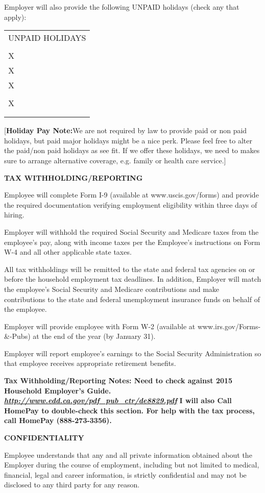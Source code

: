 \documentclass[]{article}
\begin{document}
Employer will also provide the following UNPAID holidays (check any that
apply):

\begin{tabular}[c]{@{}l@{}}
\toprule
UNPAID HOLIDAYS\tabularnewline
\tabularnewline
X\tabularnewline
X\tabularnewline
X\tabularnewline
\tabularnewline
X\tabularnewline
\tabularnewline
\tabularnewline
\bottomrule
\end{tabular}

{[}\textbf{Holiday Pay Note:}We are not required by law to provide paid
or non paid holidays, but paid major holidays might be a nice perk.
Please feel free to alter the paid/non paid holidays as see fit. If we
offer these holidays, we need to makes sure to arrange alternative
coverage, e.g. family or health care service.{]}

\textbf{TAX WITHHOLDING/REPORTING}

Employee will complete Form I-9 (available at www.uscis.gov/forms) and
provide the required documentation verifying employment eligibility
within three days of hiring.

Employer will withhold the required Social Security and Medicare taxes
from the employee's pay, along with income taxes per the Employee's
instructions on Form W-4 and all other applicable state taxes.

All tax withholdings will be remitted to the state and federal tax
agencies on or before the household employment tax deadlines. In
addition, Employer will match the employee's Social Security and
Medicare contributions and make contributions to the state and federal
unemployment insurance funds on behalf of the employee.

Employer will provide employee with Form W-2 (available at
www.irs.gov/Forms-\&-Pubs) at the end of the year (by January 31).

Employer will report employee's earnings to the Social Security
Administration so that employee receives appropriate retirement
benefits.

\textbf{Tax Withholding/Reporting Notes: Need to check against 2015
Household Employer's Guide.}
\href{http://www.edd.ca.gov/pdf_pub_ctr/de8829.pdf}{\textbf{\emph{http://www.edd.ca.gov/pdf\_pub\_ctr/de8829.pdf}}}
\textbf{I will also Call HomePay to double-check this section. For help
with the tax process, call HomePay (888-273-3356). }

\textbf{CONFIDENTIALITY}

Employee understands that any and all private information obtained about
the Employer during the course of employment, including but not limited
to medical, financial, legal and career information, is strictly
confidential and may not be disclosed to any third party for any reason.
\end{document}
